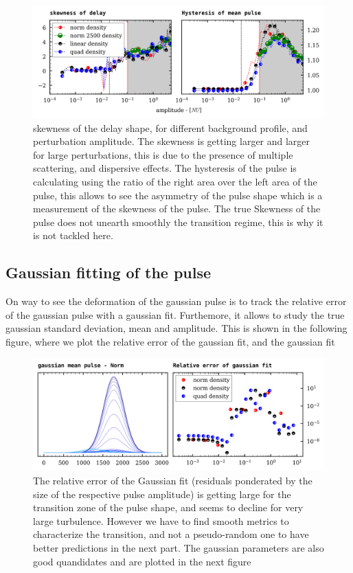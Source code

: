 \documentclass[11pt,a4paper,openany]{report}
\begin{document}
\begin{multicols}{2}
    \begin{figure}[H]
        \centering
        \includegraphics[width=1\linewidth]{./figures/skew_Hyst.png}
        \caption{skewness of the delay shape, for different background profile, and perturbation amplitude. The skewness is getting larger and larger for large perturbations, this is due to the presence of multiple scattering, and dispersive effects. The hysteresis of the pulse is calculating using the ratio of the right area over the left area of the pulse, this allows to see the asymmetry of the pulse shape which is a measurement of the skewness of the pulse.
            The true Skewness of the pulse does not unearth smoothly the transition regime, this is why it is not tackled here. }
        \label{}
    \end{figure}

    \subsection{Gaussian fitting of the pulse}
    On way to see the deformation of the gaussian pulse is to track the relative error of the gaussian pulse with a gaussian fit. Furthemore, it allows to study the true gaussian standard deviation, mean and amplitude.
    This is shown in the following figure, where we plot the relative error of the gaussian fit, and the gaussian fit
    \begin{figure}[H]
        \centering
        \includegraphics[width=1\linewidth]{./figures/gaussian_fit.png}
        \caption{The relative error of the Gaussian fit (residuals ponderated by the size of the respective pulse amplitude) is getting large for the transition zone of the pulse shape, and seems to decline for very large turbulence. However we have to find smooth metrics to characterize the transition, and not a pseudo-random one to have better predictions in the next part.
            The gaussian parameters are also good quandidates and are plotted in the next figure }
        \label{}
    \end{figure}


\end{multicols}
\end{document}
